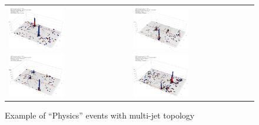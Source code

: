 %
\begin{figure}[h]
 \centering
 \begin{tabular}{ll}
   \includegraphics[width=0.47\textwidth]{fig/Physics2.png} &
   \includegraphics[width=0.47\textwidth]{fig/Physics3.png} \\
   \includegraphics[width=0.47\textwidth]{fig/Physics4.png} &
   \includegraphics[width=0.47\textwidth]{fig/Physics6.png} \\
 \end{tabular}
\caption{Example of ``Physics'' events with multi-jet topology}
\label{fig:Physics}
\end{figure}

